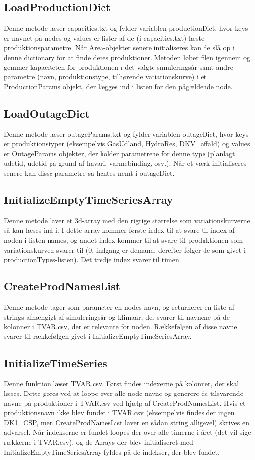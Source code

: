\documentclass{article}
\begin{document}
\subsection{LoadProductionDict} \label{sec:LoadProdctionDict}
Denne metode læser capacities.txt og fylder variablen productionDict, hvor keys er navnet på nodes og values er lister af de (i capacities.txt) læste produktionsparametre. Når Area-objekter senere initialiseres kan de slå op i denne dictionary for at finde deres produktioner. Metoden løber filen igennem og gemmer kapaciteten for produktionen i det valgte simuleringsår samt andre parametre (navn, produktionstype, tilhørende variationskurve) i et ProductionParams objekt, der lægges ind i listen for den pågældende node.

\subsection{LoadOutageDict}
Denne metode læser outageParams.txt og fylder variablen outageDict, hvor keys er produktionstyper (eksempelvis GasUdland, HydroRes, DKV\_affald) og values er OutageParams objekter, der holder parametrene for denne type (planlagt udetid, udetid på grund af havari, varmebinding, osv.). Når et værk initialiseres senere kan disse parametre så hentes nemt i outageDict.

\subsection{InitializeEmptyTimeSeriesArray}
Denne metode laver et 3d-array med den rigtige størrelse som variationskurverne så kan læses ind i. I dette array kommer første index til at svare til index af noden i listen names, og andet index kommer til at svare til produktionen som variationskurven svarer til (0. indgang er demand, derefter følger de som givet i productionTypes-listen). Det tredje index svarer til timen.

\subsection{CreateProdNamesList}
Denne metode tager som parameter en nodes navn, og returnerer en liste af strings afhængigt af simuleringsår og klimaår, der svarer til navnene på de kolonner i TVAR.csv, der er relevante for noden. Rækkefølgen af disse navne svarer til rækkefølgen givet i InitializeEmptyTimeSeriesArray. 

\subsection{InitializeTimeSeries}
Denne funktion læser TVAR.csv. Først findes indexerne på kolonner, der skal læses. Dette gøres ved at loope over alle node-navne og generere de tilsvarende navne på produktioner i TVAR.csv ved hjælp af CreateProdNamesList. Hvis et produktionsnavn ikke blev fundet i TVAR.csv (eksempelvis findes der ingen DK1\_CSP, men CreateProdNamesList laver en sådan string alligevel) skrives en advarsel. Når indekserne er fundet loopes der over alle timerne i året (det vil sige rækkerne i TVAR.csv), og de Arrays der blev initialiseret med InitializeEmptyTimeSeriesArray fyldes på de indekser, der blev fundet. 
\end{document}
